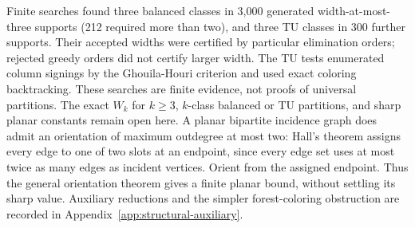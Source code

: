 Finite searches found three balanced classes in 3,000 generated
width-at-most-three supports (212 required more than two), and three
TU classes in 300 further supports. Their accepted widths were
certified by particular elimination orders; rejected greedy orders did
not certify larger width. The TU tests enumerated column signings by
the Ghouila-Houri criterion and used exact coloring backtracking.
These searches are finite evidence, not proofs of universal partitions.
The exact $W_k$ for $k\ge3$, $k$-class balanced or TU partitions, and
sharp planar constants remain open here. A planar bipartite incidence
graph does admit an orientation of maximum outdegree at most two:
Hall's theorem assigns every edge to one of two slots at an endpoint,
since every edge set uses at most twice as many edges as incident
vertices. Orient from the assigned endpoint. Thus the general
orientation theorem gives a finite planar bound, without settling its
sharp value. Auxiliary reductions and the simpler forest-coloring
obstruction are recorded in Appendix~\ref{app:structural-auxiliary}.
